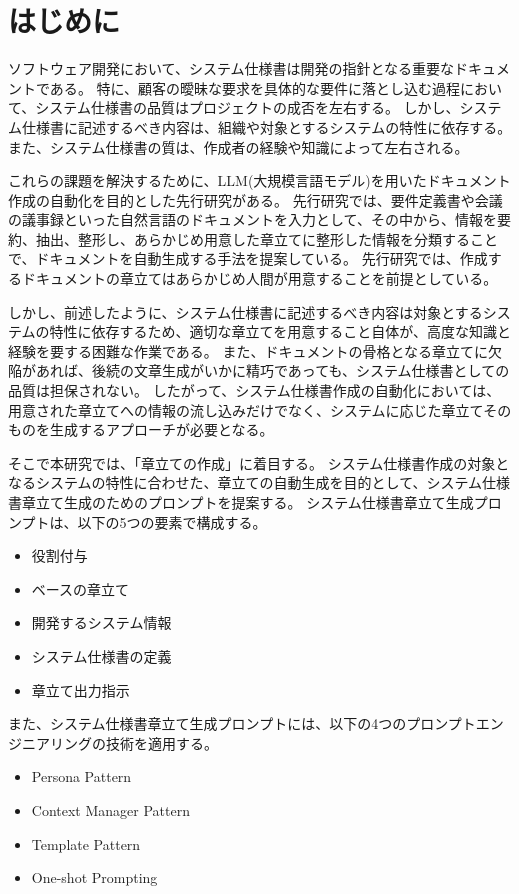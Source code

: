 \chapter{はじめに}\label{cha:Introduction}

ソフトウェア開発において、システム仕様書は開発の指針となる重要なドキュメントである\cite{rasinban}。
特に、顧客の曖昧な要求を具体的な要件に落とし込む過程において、システム仕様書の品質はプロジェクトの成否を左右する\cite{quality}。
しかし、システム仕様書に記述するべき内容は、組織や対象とするシステムの特性に依存する\cite{software_engineering}。
また、システム仕様書の質は、作成者の経験や知識によって左右される\cite{knowledge}。

これらの課題を解決するために、LLM(大規模言語モデル)\cite{whatllm}を用いたドキュメント作成の自動化を目的とした先行研究がある\cite{reference}。
先行研究では、要件定義書や会議の議事録といった自然言語のドキュメントを入力として、その中から、情報を要約、抽出、整形し、あらかじめ用意した章立てに整形した情報を分類することで、ドキュメントを自動生成する手法を提案している。
先行研究では、作成するドキュメントの章立てはあらかじめ人間が用意することを前提としている。

しかし、前述したように、システム仕様書に記述するべき内容は対象とするシステムの特性に依存するため、適切な章立てを用意すること自体が、高度な知識と経験を要する困難な作業である。
また、ドキュメントの骨格となる章立てに欠陥があれば、後続の文章生成がいかに精巧であっても、システム仕様書としての品質は担保されない。
したがって、システム仕様書作成の自動化においては、用意された章立てへの情報の流し込みだけでなく、システムに応じた章立てそのものを生成するアプローチが必要となる。

そこで本研究では、「章立ての作成」に着目する。
システム仕様書作成の対象となるシステムの特性に合わせた、章立ての自動生成を目的として、システム仕様書章立て生成のためのプロンプトを提案する。
システム仕様書章立て生成プロンプトは、以下の5つの要素で構成する。
\begin{itemize}
  \item 役割付与
  \item ベースの章立て  
  \item 開発するシステム情報
  \item システム仕様書の定義
  \item 章立て出力指示
\end{itemize}

また、システム仕様書章立て生成プロンプトには、以下の4つのプロンプトエンジニアリング\cite{prompt_engineering}の技術を適用する。
\begin{itemize}
  \item Persona Pattern
  \item Context Manager Pattern
  \item Template Pattern
  \item One-shot Prompting
\end{itemize}

